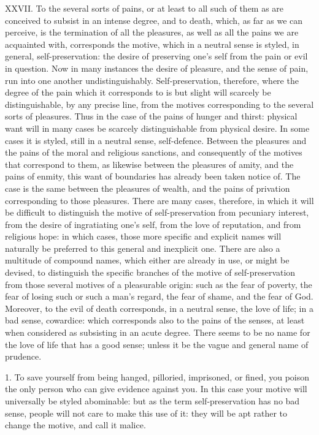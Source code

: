 \documentclass[12pt]{report}
\begin{document}
XXVII. To the several sorts of pains, or at least to all such of them as
are conceived to subsist in an intense degree, and to death, which, as
far as we can perceive, is the termination of all the pleasures, as well
as all the pains we are acquainted with, corresponds the motive, which
in a neutral sense is styled, in general, self-preservation: the desire
of preserving one's self from the pain or evil in question. Now in many
instances the desire of pleasure, and the sense of pain, run into one
another undistinguishably. Self-preservation, therefore, where the
degree of the pain which it corresponds to is but slight will scarcely
be distinguishable, by any precise line, from the motives corresponding
to the several sorts of pleasures. Thus in the case of the pains of
hunger and thirst: physical want will in many cases be scarcely
distinguishable from physical desire. In some cases it is styled, still
in a neutral sense, self-defence. Between the pleasures and the pains of
the moral and religious sanctions, and consequently of the motives that
correspond to them, as likewise between the pleasures of amity, and the
pains of enmity, this want of boundaries has already been taken notice
of. The case is the same between the pleasures of wealth, and the pains
of privation corresponding to those pleasures. There are many cases,
therefore, in which it will be difficult to distinguish the motive of
self-preservation from pecuniary interest, from the desire of
ingratiating one's self, from the love of reputation, and from religious
hope: in which cases, those more specific and explicit names will
naturally be preferred to this general and inexplicit one. There are
also a multitude of compound names, which either are already in use, or
might be devised, to distinguish the specific branches of the motive of
self-preservation from those several motives of a pleasurable origin:
such as the fear of poverty, the fear of losing such or such a man's
regard, the fear of shame, and the fear of God. Moreover, to the evil of
death corresponds, in a neutral sense, the love of life; in a bad sense,
cowardice: which corresponds also to the pains of the senses, at least
when considered as subsisting in an acute degree. There seems to be no
name for the love of life that has a good sense; unless it be the vague
and general name of prudence.

1. To save yourself from being hanged, pilloried, imprisoned, or fined,
you poison the only person who can give evidence against you. In this
case your motive will universally be styled abominable: but as the term
self-preservation has no bad sense, people will not care to make this
use of it: they will be apt rather to change the motive, and call it
malice.
\end{document}
